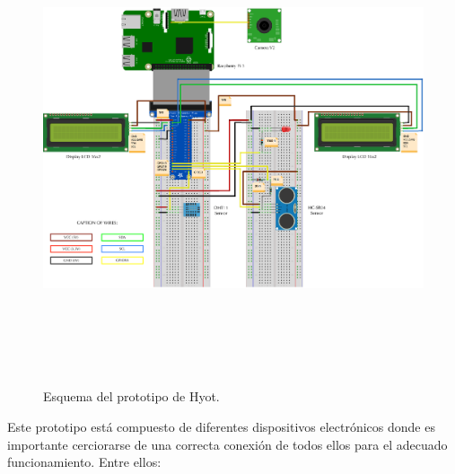 \documentclass[12pt,a4paper, twoside]{report}
\begin{document}
		\begin{figure}[!ht]   
			\caption{Esquema del prototipo de Hyot.} 
			\begin{center} 
		 		\includegraphics[width=17cm,height=13.2cm]{Images/prototype/prototype} \\
				\label{fig:annexe_prototype} 
			\end{center}  
		\end{figure}  
		
	Este \gls{prototipo} está compuesto de diferentes dispositivos electrónicos donde es importante cerciorarse de una correcta conexión de todos ellos para el adecuado funcionamiento. Entre ellos:
		
\end{document}
